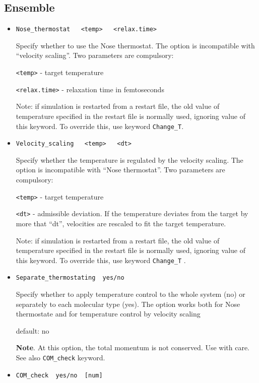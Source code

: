 \documentclass{article}
\begin{document}
\subsection{Ensemble}

\begin{itemize}

\item
\verb|Nose_thermostat   <temp>   <relax.time>|

Specify whether to use the Nose thermostat. The option is incompatible with 
``velocity scaling''. Two parameters are compulsory:

\verb|<temp>|  - target temperature

\verb|<relax.time>| - relaxation time in femtoseconds

Note: if simulation is restarted from a restart file, the old value of 
temperature specified in the restart file is normally used, ignoring value 
of this keyword. To override this, use keyword \verb|Change_T|.

\item
\verb|Velocity_scaling   <temp>   <dt>|  

Specify whether the temperature is regulated by the velocity scaling.
The option is incompatible with ``Nose thermostat''. Two
parameters are compulsory:

\verb|<temp>|  - target temperature

\verb|<dt>| - admissible deviation. If the temperature deviates from the 
target by more that ``dt'', velocities are rescaled to fit the
target temperature.
 
Note: if simulation is restarted from a restart file, the old value of 
temperature specified in the restart file is normally used, ignoring value 
of this keyword. To override this, use keyword \verb|Change_T| .

\item
\verb|Separate_thermostating  yes/no|

Specify whether to apply temperature control to the whole system (no)
or separately to each molecular type (yes). The option works both for Nose
thermostate and for temperature control by velocity scaling

default: no

{\bf Note}. At this option, the total momentum is not conserved. Use with care.
See also \verb|COM_check| keyword.

\item
\verb|COM_check  yes/no  [num]|


\end{itemize}
\end{document}
